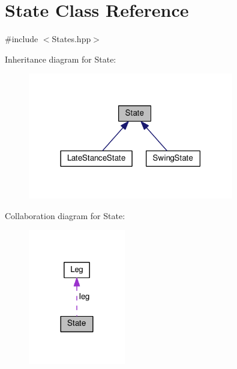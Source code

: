 \hypertarget{classState}{}\section{State Class Reference}
\label{classState}


{\ttfamily \#include $<$States.\+hpp$>$}



Inheritance diagram for State\+:\nopagebreak
\begin{figure}[H]
\begin{center}
\leavevmode
\includegraphics[width=254pt]{classState__inherit__graph}
\end{center}
\end{figure}


Collaboration diagram for State\+:
\nopagebreak
\begin{figure}[H]
\begin{center}
\leavevmode
\includegraphics[width=120pt]{classState__coll__graph}
\end{center}
\end{figure}
